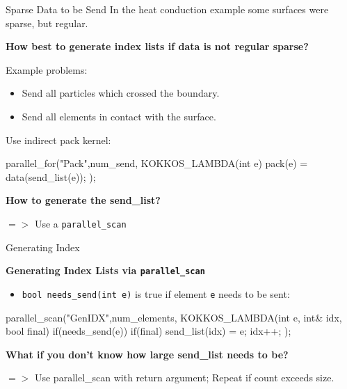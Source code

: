 \begin{frame}[fragile]{Sparse Data to be Send}
In the heat conduction example some surfaces were sparse, but regular.

\pause
\vspace{10pt}
\textbf{How best to generate index lists if data is not regular sparse?}

\pause
\vspace{10pt}
Example problems:
\begin{itemize}
  \item Send all particles which crossed the boundary.
  \item Send all elements in contact with the surface.
\end{itemize}

\pause
Use indirect pack kernel:
\begin{code}[keywords={parallel_for,send_list}]
  parallel_for("Pack",num_send, KOKKOS_LAMBDA(int e) {
    pack(e) = data(send_list(e));
  });
\end{code}

\pause
\textbf{How to generate the send\_list?}

\pause
$=>$ Use a \texttt{parallel\_scan}

\end{frame}


\begin{frame}[fragile]{Generating Index}

\textbf{Generating Index Lists via \texttt{parallel\_scan}}

\vspace{10pt}
\begin{itemize}
  \item \texttt{bool needs\_send(int e)} is true if element \texttt{e} needs to be sent:
\end{itemize}

\begin{code}[keywords={parallel_scan,send_list,final}]
parallel_scan("GenIDX",num_elements,
  KOKKOS_LAMBDA(int e, int& idx, bool final){
  if(needs_send(e)) {
    if(final) send_list(idx) = e;
    idx++;
  }
});
\end{code}

\pause
\vspace{10pt}
\textbf{What if you don't know how large send\_list needs to be?}

$=>$ Use parallel\_scan with return argument; Repeat if count exceeds size.
\end{frame}

